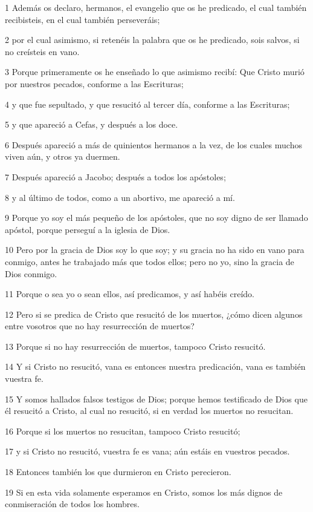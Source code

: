 \par 1 Además os declaro, hermanos, el evangelio que os he predicado, el cual también recibisteis, en el cual también perseveráis;
\par 2 por el cual asimismo, si retenéis la palabra que os he predicado, sois salvos, si no creísteis en vano.
\par 3 Porque primeramente os he enseñado lo que asimismo recibí: Que Cristo murió por nuestros pecados, conforme a las Escrituras;
\par 4 y que fue sepultado, y que resucitó al tercer día, conforme a las Escrituras;
\par 5 y que apareció a Cefas, y después a los doce.
\par 6 Después apareció a más de quinientos hermanos a la vez, de los cuales muchos viven aún, y otros ya duermen.
\par 7 Después apareció a Jacobo; después a todos los apóstoles;
\par 8 y al último de todos, como a un abortivo, me apareció a mí.
\par 9 Porque yo soy el más pequeño de los apóstoles, que no soy digno de ser llamado apóstol, porque perseguí a la iglesia de Dios.
\par 10 Pero por la gracia de Dios soy lo que soy; y su gracia no ha sido en vano para conmigo, antes he trabajado más que todos ellos; pero no yo, sino la gracia de Dios conmigo.
\par 11 Porque o sea yo o sean ellos, así predicamos, y así habéis creído.
\par 12 Pero si se predica de Cristo que resucitó de los muertos, ¿cómo dicen algunos entre vosotros que no hay resurrección de muertos?
\par 13 Porque si no hay resurrección de muertos, tampoco Cristo resucitó.
\par 14 Y si Cristo no resucitó, vana es entonces nuestra predicación, vana es también vuestra fe.
\par 15 Y somos hallados falsos testigos de Dios; porque hemos testificado de Dios que él resucitó a Cristo, al cual no resucitó, si en verdad los muertos no resucitan.
\par 16 Porque si los muertos no resucitan, tampoco Cristo resucitó;
\par 17 y si Cristo no resucitó, vuestra fe es vana; aún estáis en vuestros pecados.
\par 18 Entonces también los que durmieron en Cristo perecieron.
\par 19 Si en esta vida solamente esperamos en Cristo, somos los más dignos de conmiseración de todos los hombres.
